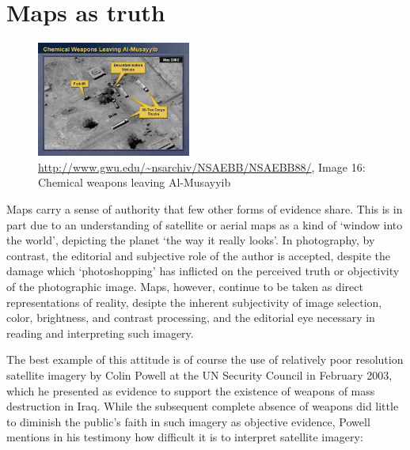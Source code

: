 \documentclass[11pt,oneside,notitlepage]{report}
\begin{document}
\section{Maps as truth}
\label{sec:truth}

\begin{figure}
	\begin{flushright}
		\includegraphics[width=0.45\textwidth]{images/iraq-image-16.jpg}
		\caption{\url{http://www.gwu.edu/~nsarchiv/NSAEBB/NSAEBB88/}, Image 16: Chemical weapons leaving Al-Musayyib}
	\end{flushright}
\end{figure}

Maps carry a sense of authority that few other forms of evidence share. This is in part due to an understanding of satellite or aerial maps as a kind of `window into the world', depicting the planet `the way it really looks'. In photography, by contrast, the editorial and subjective role of the author is accepted, despite the damage which `photoshopping' has inflicted on the perceived truth or objectivity of the photographic image. Maps, however, continue to be taken as direct representations of reality, desipte the inherent subjectivity of image selection, color, brightness, and contrast processing, and the editorial eye necessary in reading and interpreting such imagery. 

The best example of this attitude is of course the use of relatively poor resolution satellite imagery by Colin Powell at the UN Security Council in February 2003, which he presented as evidence to support the existence of weapons of mass destruction in Iraq. While the subsequent complete absence of weapons did little to diminish the public's faith in such imagery as objective evidence, Powell mentions in his testimony how difficult it is to interpret satellite imagery:  

\end{document}
